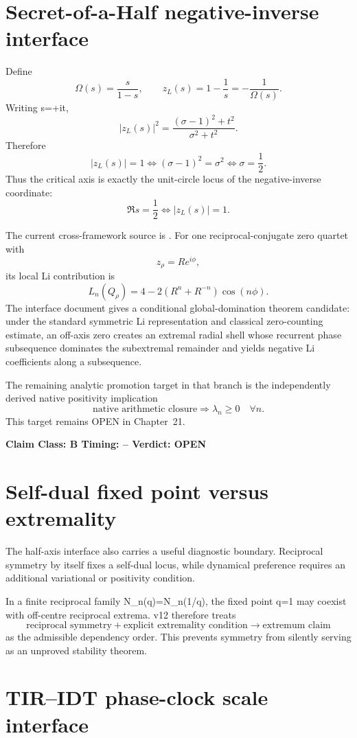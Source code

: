 \documentclass[11pt,a4paper,twoside]{book}
\def\({}%
\def\){}%
\theoremstyle{definition}
\newcommand{\vTwelveStatus}[3]{\par\noindent\textbf{Claim Class: #1 \quad Timing: #2 \quad Verdict: #3}\par}
\begin{document}
\section{Secret-of-a-Half negative-inverse interface}

Define
\[
\Omega(s)=\frac{s}{1-s},
\qquad
z_L(s)=1-\frac1s=-\frac1{\Omega(s)}.
\]
Writing \(s=\sigma+it\),
\[
|z_L(s)|^2
=
\frac{(\sigma-1)^2+t^2}{\sigma^2+t^2}.
\]
Therefore
\[
|z_L(s)|=1
\iff
(\sigma-1)^2=\sigma^2
\iff
\boxed{\sigma=\frac12}.
\]
Thus the critical axis is exactly the unit-circle locus of the
negative-inverse coordinate:
\[
\boxed{
\Re s=\frac12
\iff
|z_L(s)|=1.
}
\]

The current cross-framework source is
.
For one reciprocal-conjugate zero quartet with
\[
z_\rho=Re^{i\phi},
\]
its local Li contribution is
\[
L_n(Q_\rho)
=4-2(R^n+R^{-n})\cos(n\phi).
\]
The interface document gives a conditional global-domination theorem candidate:
under the standard symmetric Li representation and classical zero-counting
estimate, an off-axis zero creates an extremal radial shell whose recurrent
phase subsequence dominates the subextremal remainder and yields negative Li
coefficients along a subsequence.

The remaining analytic promotion target in that branch is the independently
derived native positivity implication
\[
\boxed{
\text{native arithmetic closure}
\Longrightarrow
\lambda_n\ge0\quad\forall n.
}
\]
This target remains OPEN in Chapter~21.
\vTwelveStatus{B}{--}{OPEN}

\section{Self-dual fixed point versus extremality}

The half-axis interface also carries a useful diagnostic boundary.  Reciprocal
symmetry by itself fixes a self-dual locus, while dynamical preference requires
an additional variational or positivity condition.

In a finite reciprocal family \(N_n(q)=N_n(1/q)\), the fixed point \(q=1\) may
coexist with off-centre reciprocal extrema.  v12 therefore treats
\[
\boxed{
\text{reciprocal symmetry}
+\text{explicit extremality condition}
\to
\text{extremum claim}
}
\]
as the admissible dependency order.  This prevents symmetry from silently
serving as an unproved stability theorem.

\section{TIR--IDT phase-clock scale interface}
\end{document}
